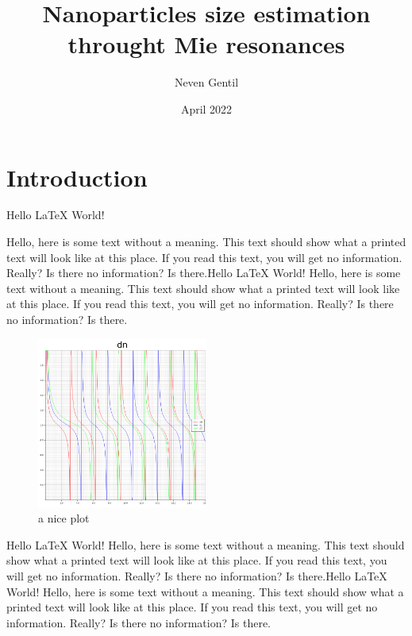 \documentclass{article}
\title{Nanoparticles size estimation throught Mie resonances}
\author{Neven Gentil}
\date{April 2022}
\begin{document}
\maketitle

\twocolumn

\section{Introduction}

Hello LaTeX World!

Hello, here is some text without a meaning. This text should show what a printed text will look like at this place.
If you read this text, you will get no information. Really? Is there no information? Is there.Hello LaTeX World!
Hello, here is some text without a meaning. This text should show what a printed text will look like at this place.
If you read this text, you will get no information. Really? Is there no information? Is there.
\begin{figure}[h]
    \centering
    \includegraphics[width=0.5\textwidth, height=0.25\textheight]{dn.png}
    \caption{a nice plot}
    \label{fig:dn_plot}
\end{figure}
Hello LaTeX World!
Hello, here is some text without a meaning. This text should show what a printed text will look like at this place.
If you read this text, you will get no information. Really? Is there no information? Is there.Hello LaTeX World!
Hello, here is some text without a meaning. This text should show what a printed text will look like at this place.
If you read this text, you will get no information. Really? Is there no information? Is there.
\end{document}
